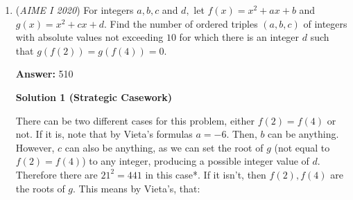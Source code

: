 \begin{enumerate}
 It remains to consider other possible values for $n$. If $n = 13^2 = 169$, then $m$ must be divisible by $13$ but not $169$, and $m^m$ must be a multiple of $n^n = 169^{169} = 13^{338}$, so $m > 338$. Then $k = m + n > 169 + 338 = 507$. All other possible values for $n$ have $n \ge 242$, and in this case $m > n \ge 242$, so $k \ge 2 \cdot 242 = 484$. Hence no greater values of $n$ can produce lesser values for $k$, and the least possible $k$ is indeed $407$.

 



\textbf{Solution 5}

Because $210 = 2\times3\times5\times7$, the minimum factor of $m+n$ can have is $11$.Suppose $(m,n) = 11$
$\left\{ 	\begin{aligned} 		&m=11a\\ 		&n=11b 	\end{aligned} \right.$$(a,b) = 1$
$11b \mid 11a$
$\textbf{Min} b = 11$
$n=11^2$

 So $a>22$

 We only need to test several more values of a to see whether the condition $\gcd(m+n,210)=1$ fits:

 $a=23, 2\mid a+b = 34$
$a=24, 5\mid a+b = 35$
$a=25, 2\mid a+b = 36$
$a=26, a+b = 37$

 Therefore $\textbf{Min} (m+n) = 11(a+b) = 11\times37 = \boxed{407}$

 -cassphe

 


 


	\item (\textit{AIME I 2020}) For integers $a,b,c$ and $d,$ let $f(x)=x^2+ax+b$ and $g(x)=x^2+cx+d.$ Find the number of ordered triples $(a,b,c)$ of integers with absolute values not exceeding $10$ for which there is an integer $d$ such that $g(f(2))=g(f(4))=0.$

 \textbf{Answer: }510



\textbf{Solution 1 (Strategic Casework)}

There can be two different cases for this problem, either $f(2)=f(4)$ or not. If it is, note that by Vieta's formulas $a = -6$. Then, $b$ can be anything. However, $c$ can also be anything, as we can set the root of $g$ (not equal to $f(2) = f(4)$) to any integer, producing a possible integer value of $d$. Therefore there are $21^2 = 441$ in this case*. If it isn't, then $f(2),f(4)$ are the roots of $g$. This means by Vieta's, that:


\end{enumerate}
